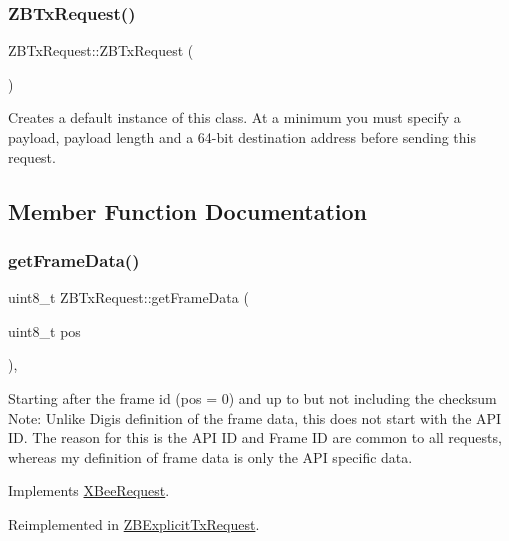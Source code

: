 \subsubsection{\texorpdfstring{Z\+B\+Tx\+Request()}{ZBTxRequest()}\hspace{0.1cm}{\footnotesize\ttfamily [2/2]}}
{\footnotesize\ttfamily Z\+B\+Tx\+Request\+::\+Z\+B\+Tx\+Request (\begin{DoxyParamCaption}{ }\end{DoxyParamCaption})}

Creates a default instance of this class. At a minimum you must specify a payload, payload length and a 64-\/bit destination address before sending this request. 

\subsection{Member Function Documentation}
\hypertarget{class_z_b_tx_request_ac81e09dfbf7aefbdf7f8b4838b643c5c}{}\label{class_z_b_tx_request_ac81e09dfbf7aefbdf7f8b4838b643c5c} 
\subsubsection{\texorpdfstring{get\+Frame\+Data()}{getFrameData()}}
{\footnotesize\ttfamily uint8\+\_\+t Z\+B\+Tx\+Request\+::get\+Frame\+Data (\begin{DoxyParamCaption}\item[{uint8\+\_\+t}]{pos }\end{DoxyParamCaption})\hspace{0.3cm}{\ttfamily [protected]}, {\ttfamily [virtual]}}

Starting after the frame id (pos = 0) and up to but not including the checksum Note\+: Unlike Digi\textquotesingle{}s definition of the frame data, this does not start with the A\+PI ID. The reason for this is the A\+PI ID and Frame ID are common to all requests, whereas my definition of frame data is only the A\+PI specific data. 

Implements \hyperlink{class_x_bee_request_ad5b998cd95a570bdaa4d74c6c8790d94}{X\+Bee\+Request}.



Reimplemented in \hyperlink{class_z_b_explicit_tx_request_a3d961e023bcf422543f65ed04da2240a}{Z\+B\+Explicit\+Tx\+Request}.


